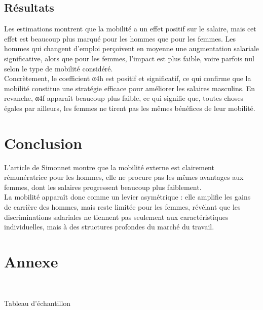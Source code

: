 \documentclass{article}
\begin{document}
\subsection{Résultats}

Les estimations montrent que la mobilité a un effet positif sur le salaire, mais cet effet est beaucoup plus marqué pour les hommes que pour les femmes. Les hommes qui changent d’emploi perçoivent en moyenne une augmentation salariale significative, alors que pour les femmes, l’impact est plus faible, voire parfois nul selon le type de mobilité considéré.\\
Concrètement, le coefficient α4h  est positif et significatif, ce qui confirme que la mobilité constitue une stratégie efficace pour améliorer les salaires masculins. En revanche, α4f  apparaît beaucoup plus faible, ce qui signifie que, toutes choses égales par ailleurs, les femmes ne tirent pas les mêmes bénéfices de leur mobilité.

\section{Conclusion}

L’article de Simonnet montre que la mobilité externe est clairement rémunératrice pour les hommes, elle ne procure pas les mêmes avantages aux femmes, dont les salaires progressent beaucoup plus faiblement. \\
La mobilité apparaît donc comme un levier asymétrique : elle amplifie les gains de carrière des hommes, mais reste limitée pour les femmes, révélant que les discriminations salariales ne tiennent pas seulement aux caractéristiques individuelles, mais à des structures profondes du marché du travail.

\section{Annexe}

\begin{center}
  \setlength{\fboxsep}{0.1cm} 
  \setlength{\fboxrule}{1pt}
  \\
    \vspace{0.1cm}
    \caption{Tableau d'échantillon}
\end{center}
\end{document}
